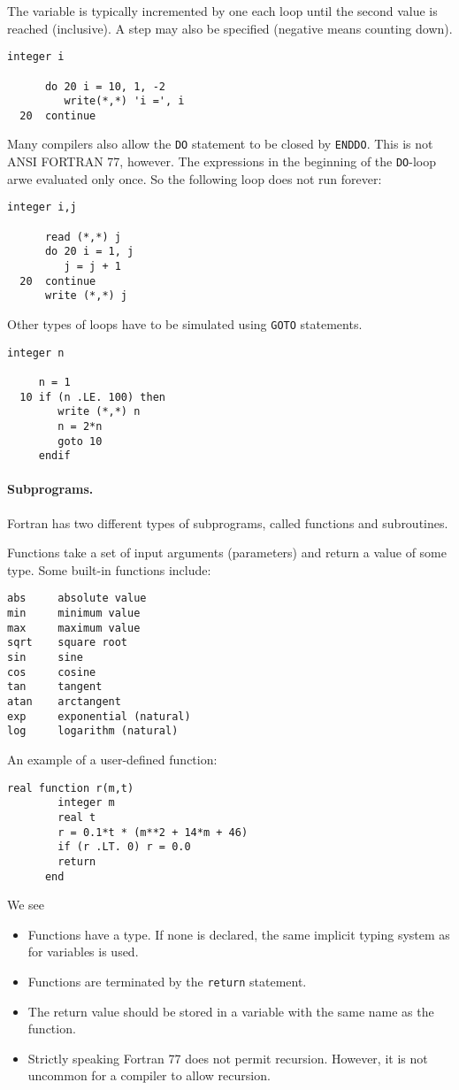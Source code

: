The variable is typically incremented by one each loop until the second value is reached (inclusive). A step may also be specified (negative means counting down).
\begin{lstlisting}[language={[77]fortran}, style=snippet]
      integer i
 
      do 20 i = 10, 1, -2
         write(*,*) 'i =', i
  20  continue
\end{lstlisting}

Many compilers also allow the \texttt{DO} statement to be closed by \texttt{ENDDO}. This is not ANSI FORTRAN 77, however. The expressions in the beginning of the \texttt{DO}-loop arwe evaluated only once. So the following loop does not run forever:
\begin{lstlisting}[language={[77]fortran}, style=snippet]
      integer i,j
 
      read (*,*) j
      do 20 i = 1, j
         j = j + 1
  20  continue
      write (*,*) j
\end{lstlisting}

Other types of loops have to be simulated using \texttt{GOTO} statements.
\begin{lstlisting}[language={[77]fortran}, style=snippet]
     integer n

     n = 1
  10 if (n .LE. 100) then
        write (*,*) n
        n = 2*n
        goto 10
     endif
\end{lstlisting}

\paragraph{Subprograms.}
Fortran has two different types of subprograms, called functions and subroutines. 

Functions take a set of input arguments (parameters) and return a value of some type.
Some built-in functions include:
\begin{lstlisting}
abs     absolute value
min     minimum value
max     maximum value
sqrt    square root
sin     sine
cos     cosine
tan     tangent
atan    arctangent
exp     exponential (natural)
log     logarithm (natural)
\end{lstlisting}

An example of a user-defined function:
\begin{lstlisting}[language={[77]fortran}, style=snippet]
      real function r(m,t)
        integer m
        real t
        r = 0.1*t * (m**2 + 14*m + 46)
        if (r .LT. 0) r = 0.0
        return
      end
\end{lstlisting}
We see
\begin{itemize}
\item Functions have a type. If none is declared, the same implicit typing system as for variables is used.
\item Functions are terminated by the \texttt{return} statement.
\item The return value should be stored in a variable with the same name as the function. 
\item Strictly speaking Fortran 77 does not permit recursion. However, it is not uncommon for a compiler to allow recursion. 
\end{itemize}

